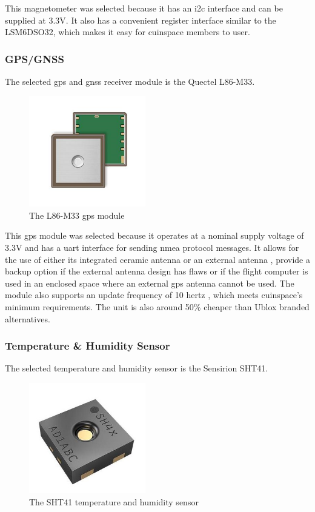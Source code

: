 This magnetometer was selected because it has an \gls{i2c} interface and can be supplied at 3.3V.
\cite{lis2mdl-datasheet} It also has a convenient register interface similar to the LSM6DSO32, which makes it easy for
\gls{cuinspace} members to user.

\subsubsection{GPS/GNSS}

The selected \gls{gps} and \gls{gnss} receiver module is the Quectel L86-M33.

\begin{figure}[H]
    \center
    \includegraphics[width=2in]{assets/images/l86m33.png}
    \caption{The L86-M33 \gls{gps} module \cite{gps-pic}}
    \label{fig:gps}
\end{figure}

This \gls{gps} module was selected because it operates at a nominal supply voltage of 3.3V \cite{gps-datasheet} and has
a \gls{uart} interface for sending \gls{nmea} protocol messages. \cite{gps-datasheet} It allows for the use of either
its integrated ceramic antenna or an external antenna \cite{gps-datasheet}, provide a backup option if the external
antenna design has flaws or if the flight computer is used in an enclosed space where an external \gls{gps} antenna
cannot be used. The module also supports an update frequency of 10 hertz \cite{gps-datasheet}, which meets
\gls{cuinspace}'s minimum requirements. The unit is also around 50\% cheaper than Ublox branded alternatives.

\subsubsection{Temperature \& Humidity Sensor}

The selected temperature and humidity sensor is the Sensirion SHT41.

\begin{figure}[H]
    \centering
    \includegraphics[width=2in]{assets/images/sht41.jpg}
    \caption{The SHT41 temperature and humidity sensor \cite{sht41-pic}}
\end{figure}

